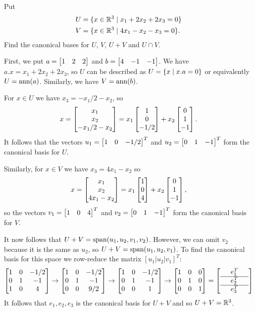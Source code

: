 \documentclass[a4paper]{amsart}
\renewenvironment{solution}{\SolutionInline}{\endSolutionInline}
\begin{document}
\begin{exercise}\label{ex-plus-cap-ii}
 Put 
 \begin{align*}
  U &= \{x\in{\mathbb{R}}^3 \;|\; x_1+2x_2+2x_3 = 0 \} \\
  V &= \{x\in{\mathbb{R}}^3 \;|\; 4x_1-x_2-x_3 = 0 \}.
 \end{align*}
 Find the canonical bases for $U$, $V$, $U+V$ and $U\cap V$.  
\end{exercise}
\begin{solution}
 First, we put $a=\left[\begin{matrix} 1&2&2\end{matrix}\right]$ and $b=\left[\begin{matrix} 4&-1&-1\end{matrix}\right]$.  We have
 $a.x=x_1+2x_2+2x_3$, so $U$ can be described as $U=\{x\;|\; x.a=0\}$ or
 equivalently $U=\operatorname{ann}(a)$.  Similarly, we have $V=\operatorname{ann}(b)$.  

 For $x\in U$ we have $x_3=-x_1/2-x_2$, so 
 \[ x = \left[\begin{matrix} x_1 \\ x_2 \\ -x_1/2-x_2 \end{matrix}\right] 
      = x_1\left[\begin{matrix} 1\\0\\-1/2\end{matrix}\right] + x_2 \left[\begin{matrix} 0\\ 1\\ -1\end{matrix}\right].
 \]
 It follows that the vectors $u_1=\left[\begin{matrix} 1&0&-1/2\end{matrix}\right]^T$ and
 $u_2=\left[\begin{matrix} 0&1&-1\end{matrix}\right]^T$ form the canonical basis for $U$.

 Similarly, for $x\in V$ we have $x_3=4x_1-x_2$ so 
 \[ x = \left[\begin{matrix} x_1 \\ x_2 \\ 4x_1-x_2 \end{matrix}\right]
      = x_1 \left[\begin{matrix} 1 \\ 0 \\ 4 \end{matrix}\right] + x_2 \left[\begin{matrix} 0 \\ 1 \\ -1 \end{matrix}\right],
 \]
 so the vectors $v_1=\left[\begin{matrix} 1&0&4\end{matrix}\right]^T$ and $v_2=\left[\begin{matrix} 0&1&-1\end{matrix}\right]^T$
 form the canonical basis for $V$.

 It now follows that $U+V=\operatorname{span}(u_1,u_2,v_1,v_2)$.  However, we can
 omit $v_2$ because it is the same as $u_2$, so
 $U+V=\operatorname{span}(u_1,u_2,v_1)$.  To find the canonical basis for this space
 we row-reduce the matrix $[u_1|u_2|v_1]^T$:
 \[
   \left[\begin{matrix} 
    1 & 0 & -1/2 \\
    0 & 1 & -1 \\
    1 & 0 & 4 
   \end{matrix}\right]
   \to 
   \left[\begin{matrix} 
    1 & 0 & -1/2 \\
    0 & 1 & -1 \\
    0 & 0 & 9/2 
   \end{matrix}\right]
   \to 
   \left[\begin{matrix} 
    1 & 0 & -1/2 \\
    0 & 1 & -1 \\
    0 & 0 &  1 
   \end{matrix}\right]
   \to 
   \left[\begin{matrix} 
    1 & 0 &  0 \\
    0 & 1 &  0 \\
    0 & 0 &  1 
   \end{matrix}\right]
   = 
   \left[\begin{array}{ccc}
    & e_1^T & \\ \hline
    & e_2^T & \\ \hline
    & e_3^T & 
   \end{array}\right]
 \]
 It follows that $e_1,e_2,e_3$ is the canonical basis for $U+V$ and so
 $U+V={\mathbb{R}}^3$.  


\end{solution}
\end{document}
